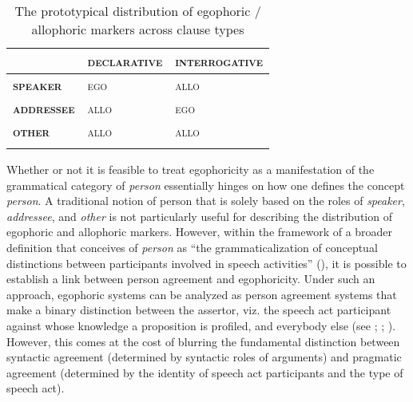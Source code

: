 \documentclass[output=paper]{langsci/langscibook}
\begin{document}
\begin{table}
\begin{tabularx}{.80\textwidth}{XXX}
\lsptoprule
	&	\textbf{\textsc{declarative}}	& \textbf{\textsc{interrogative}}	\\
\midrule
\textbf{\textsc{speaker}}	&	\textsc{ego}	&	\textsc{allo}	\\
\textbf{\textsc{addressee}}	&	\textsc{allo}	&	\textsc{ego}	\\
\textbf{\textsc{other}}	&	\textsc{allo}	&	\textsc{allo}	\\
\lspbottomrule
\end{tabularx}
\caption{The prototypical distribution of egophoric / allophoric markers across clause types}
\label{tab:mw2}
\end{table}	

Whether or not it is feasible to treat egophoricity as a manifestation of the grammatical category of \emph{person} essentially hinges on how one defines the concept \emph{person}. A traditional notion of person that is solely based on the roles of \emph{speaker}, \emph{addressee}, and \emph{other} is not particularly useful for describing the distribution of egophoric and allophoric markers. However, within the framework of a broader definition that conceives of \emph{person} as “the grammaticalization of conceptual distinctions between participants involved in speech activities” (\citealt[220]{BickelNichols2007}), it is possible to establish a link between person agreement and egophoricity. Under such an approach, egophoric systems can be analyzed as person agreement systems that make a binary distinction between the assertor, viz. the speech act participant against whose knowledge a proposition is profiled, and everybody else (see \citealt{Bickel2008}; \citealt[223]{BickelNichols2007}; \citealt{Creissels2008}). However, this comes at the cost of blurring the fundamental distinction between syntactic agreement (determined by syntactic roles of arguments) and pragmatic agreement (determined by the identity of speech act participants and the type of speech act).
\end{document}
